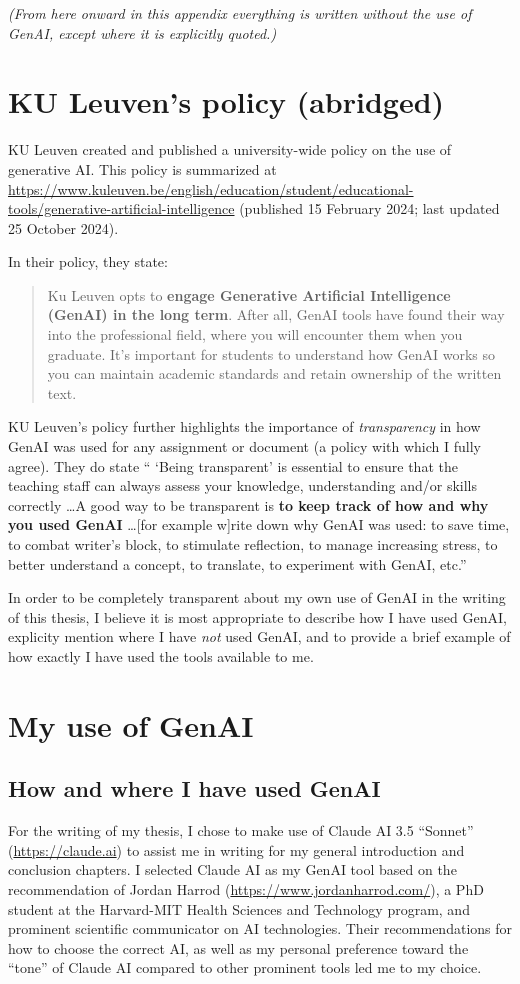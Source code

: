 \textit{(From here onward in this appendix everything is written without the use of GenAI, except where it is explicitly quoted.)}

\section*{KU Leuven's policy (abridged)}
KU Leuven created and published a university-wide policy on the use of generative AI.
This policy is summarized at \url{https://www.kuleuven.be/english/education/student/educational-tools/generative-artificial-intelligence} (published 15 February 2024; last updated 25 October 2024).

In their policy, they state:

\begin{quote}
    Ku Leuven opts to \textbf{engage Generative Artificial Intelligence (GenAI) in the long term}. After all, GenAI tools have found their way into the professional field, where you will encounter them when you graduate. It's important for students to understand how GenAI works so you can maintain academic standards and retain ownership of the written text.
\end{quote}

KU Leuven's policy further highlights the importance of \textit{transparency} in how GenAI was used for any assignment or document (a policy with which I fully agree).
They do state `` `Being transparent' is essential to ensure that the teaching staff can always assess your knowledge, understanding and/or skills correctly \ldots A good way to be transparent is \textbf{to keep track of how and why you used GenAI} \ldots [for example w]rite down why GenAI was used: to save time, to combat writer's block, to stimulate reflection, to manage increasing stress, to better understand a concept, to translate, to experiment with GenAI, etc.''

In order to be completely transparent about my own use of GenAI in the writing of this thesis, I believe it is most appropriate to describe how I have used GenAI, explicity mention where I have \textit{not} used GenAI, and to provide a brief example of how exactly I have used the tools available to me.

\section*{My use of GenAI}

\subsection*{How and where I have used GenAI}
For the writing of my thesis, I chose to make use of Claude AI 3.5 ``Sonnet'' (\url{https://claude.ai}) to assist me in writing for my general introduction and conclusion chapters.
I selected Claude AI as my GenAI tool based on the recommendation of Jordan Harrod (\url{https://www.jordanharrod.com/}), a PhD student at the Harvard-MIT Health Sciences and Technology program, and prominent scientific communicator on AI technologies.
Their recommendations for how to choose the correct AI, as well as my personal preference toward the ``tone'' of Claude AI compared to other prominent tools led me to my choice.

